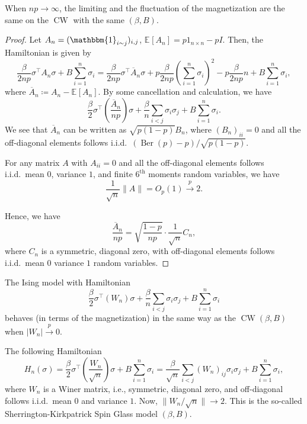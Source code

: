 \begin{theorem}
	When \(np \to \infty \), the limiting and the fluctuation of the magnetization are the same on the \(\operatorname{CW} \) with the same \((\beta , B)\).
\end{theorem}
\begin{proof}
	Let \(A_n = (\mathbbm{1}_{i \sim j} )_{i, j}\), \(\mathbb{E}_{}[A_n] = p 1_{n \times n} - p I\). Then, the Hamiltonian is given by
	\[
		\frac{\beta }{2np} \sigma ^{\top} A_n \sigma + B \sum_{i=1}^{n} \sigma _i
		= \frac{\beta }{2np} \sigma ^{\top} \overline{A} _n \sigma + p \frac{\beta }{2np} \left( \sum_{i=1}^{n} \sigma _i \right) ^2 - p \frac{\beta }{2np} n + B \sum_{i=1}^{n} \sigma _i,
	\]
	where \(\overline{A} _n \coloneqq A_n - \mathbb{E}_{}[A_n] \). By some cancellation and calculation, we have
	\[
		\frac{\beta }{2} \sigma ^{\top} \left( \frac{\overline{A} _n}{np} \right) \sigma + \frac{\beta }{n} \sum_{i < j} \sigma _i \sigma _j + B \sum_{i=1}^{n} \sigma _i.
	\]
	We see that \(\overline{A} _n\) can be written as \(\sqrt{p (1 - p)} B_n\), where \((B_n)_{i i} = 0\) and all the off-diagonal elements follows i.i.d.\ \((\operatorname{Ber}(p) - p) / \sqrt{p(1 - p)} \).

	\begin{theorem}
		For any matrix \(A\) with \(A_{i i} = 0\) and all the off-diagonal elements follows i.i.d.\ mean \(0\), variance \(1\), and finite \(6^{\text{th} }\) moments random variables, we have
		\[
			\frac{1}{\sqrt{n} } \lVert A \rVert
			= O_p(1)
			\overset{p}{\to} 2.
		\]
	\end{theorem}

	Hence, we have
	\[
		\frac{\overline{A} _n}{np}
		= \sqrt{\frac{1 - p}{np}} \cdot \frac{1}{\sqrt{n} } C_n,
	\]
	where \(C_n\) is a symmetric, diagonal zero, with off-diagonal elements follows i.i.d.\ mean \(0\) variance \(1\) random variables.
\end{proof}

\begin{lemma}
	The Ising model with Hamiltonian
	\[
		\frac{\beta }{2} \sigma ^{\top} (W_n) \sigma + \frac{\beta }{n} \sum_{i < j} \sigma _i \sigma _j + B \sum_{i=1}^{n} \sigma _i
	\]
	behaves (in terms of the magnetization) in the same way as the \(\operatorname{CW}(\beta , B) \) when \(\lvert W_n \rvert \overset{p}{\to} 0\).
\end{lemma}

The following Hamiltonian
\[
	H_n(\sigma )
	= \frac{\beta }{2} \sigma ^{\top} \left( \frac{W_n}{\sqrt{n} } \right) \sigma + B \sum_{i=1}^{n} \sigma _i
	= \frac{\beta }{\sqrt{n} } \sum_{i < j} (W_n)_{ij} \sigma _i \sigma _j + B \sum_{i=1}^{n} \sigma _i,
\]
where \(W_n\) is a Winer matrix, i.e., symmetric, diagonal zero, and off-diagonal follows i.i.d.\ mean \(0\) and variance \(1\). Now, \(\lVert W_n / \sqrt{n} \rVert \to 2\). This is the so-called Sherrington-Kirkpatrick Spin Glass model \((\beta , B)\).


